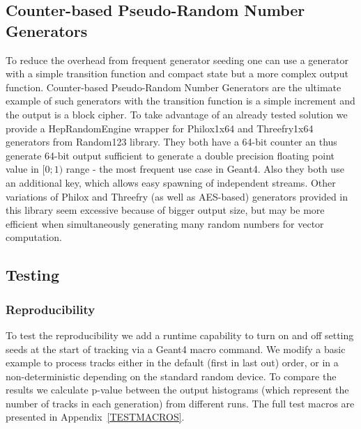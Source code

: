 \documentclass[a4paper, 12pt]{article} %
\begin{document}
 \subsection{Counter-based Pseudo-Random Number Generators}
  To reduce the overhead from frequent generator seeding one can use a generator with a simple transition function and compact state but a more complex output function. %
  Counter-based Pseudo-Random Number Generators are the ultimate example of such generators with the transition function is a simple increment and the output is a block cipher.
  To take advantage of an already tested solution we provide a HepRandomEngine wrapper for Philox1x64 and Threefry1x64 generators from Random123 library. %
  They both have a 64-bit counter an thus generate 64-bit output sufficient to generate a double precision floating point value in $[0;1)$ range - the most frequent use case in Geant4.
  Also they both use an additional key, which allows easy spawning of independent streams.
  Other variations of Philox and Threefry (as well as AES-based) generators provided in this library seem excessive because of bigger output size, but may be more efficient when simultaneously generating many random numbers for vector computation.
 
 
 \subsection{Testing}
  \subsubsection{Reproducibility}
   To test the reproducibility we add a runtime capability to turn on and off setting seeds at the start of tracking via a Geant4 macro command.
   We modify a basic example to process tracks either in the default (first in last out) order, or in a non-deterministic depending on the standard random device.
   To compare the results we calculate p-value between the output histograms (which represent the number of tracks in each generation) from different runs.
   The full test macros are presented in Appendix~\ref{TESTMACROS}.
  
\end{document}
